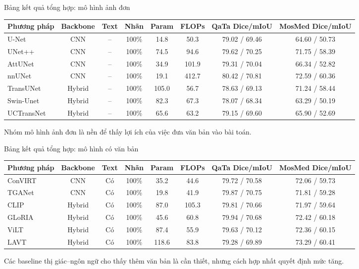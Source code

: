 \documentclass[aspectratio=169,11pt]{beamer}
\newcommand{\smallnote}[1]{%
  \par
  \vspace{0.12cm}
  {\footnotesize\color{ink}#1\par}
}
\begin{document}
\begin{frame}{Bảng kết quả tổng hợp: mô hình ảnh đơn}
  \centering
  \tiny
  \renewcommand{\arraystretch}{1.12}
  \begin{tabular}{lccccccc}
    \toprule
    \textbf{Phương pháp} & \textbf{Backbone} & \textbf{Text} & \textbf{Nhãn} & \textbf{Param} & \textbf{FLOPs} & \textbf{QaTa Dice/mIoU} & \textbf{MosMed Dice/mIoU} \\
    \midrule
    U-Net & CNN & -- & 100\% & 14.8 & 50.3 & 79.02 / 69.46 & 64.60 / 50.73 \\
    UNet++ & CNN & -- & 100\% & 74.5 & 94.6 & 79.62 / 70.25 & 71.75 / 58.39 \\
    AttUNet & CNN & -- & 100\% & 34.9 & 101.9 & 79.31 / 70.04 & 66.34 / 52.82 \\
    nnUNet & CNN & -- & 100\% & 19.1 & 412.7 & 80.42 / 70.81 & 72.59 / 60.36 \\
    TransUNet & Hybrid & -- & 100\% & 105.0 & 56.7 & 78.63 / 69.13 & 71.24 / 58.44 \\
    Swin-Unet & Hybrid & -- & 100\% & 82.3 & 67.3 & 78.07 / 68.34 & 63.29 / 50.19 \\
    UCTransNet & Hybrid & -- & 100\% & 65.6 & 63.2 & 79.15 / 69.60 & 65.90 / 52.69 \\
    \bottomrule
  \end{tabular}
  \smallnote{Nhóm mô hình ảnh đơn là nền để thấy lợi ích của việc đưa văn bản vào bài toán.}
\end{frame}

\begin{frame}{Bảng kết quả tổng hợp: mô hình có văn bản}
  \centering
  \tiny
  \renewcommand{\arraystretch}{1.10}
  \begin{tabular}{lccccccc}
    \toprule
    \textbf{Phương pháp} & \textbf{Backbone} & \textbf{Text} & \textbf{Nhãn} & \textbf{Param} & \textbf{FLOPs} & \textbf{QaTa Dice/mIoU} & \textbf{MosMed Dice/mIoU} \\
    \midrule
    ConVIRT & CNN & Có & 100\% & 35.2 & 44.6 & 79.72 / 70.58 & 72.06 / 59.73 \\
    TGANet & CNN & Có & 100\% & 19.8 & 41.9 & 79.87 / 70.75 & 71.81 / 59.28 \\
    CLIP & Hybrid & Có & 100\% & 87.0 & 105.3 & 79.81 / 70.66 & 71.97 / 59.64 \\
    GLoRIA & Hybrid & Có & 100\% & 45.6 & 60.8 & 79.94 / 70.68 & 72.42 / 60.18 \\
    ViLT & Hybrid & Có & 100\% & 87.4 & 55.9 & 79.63 / 70.12 & 72.36 / 60.15 \\
    LAVT & Hybrid & Có & 100\% & 118.6 & 83.8 & 79.28 / 69.89 & 73.29 / 60.41 \\
    \bottomrule
  \end{tabular}
  \smallnote{Các baseline thị giác--ngôn ngữ cho thấy thêm văn bản là cần thiết, nhưng cách hợp nhất quyết định mức tăng.}
\end{frame}
\end{document}
